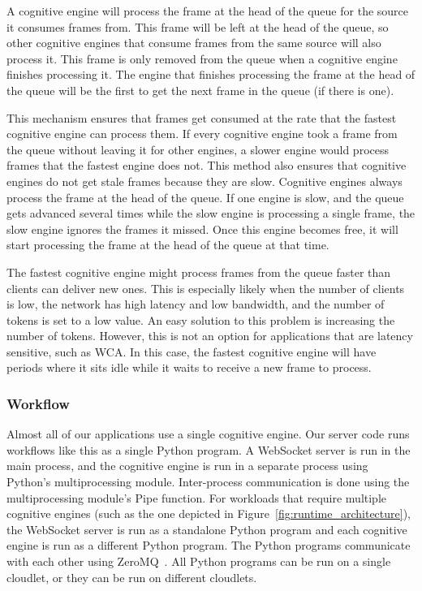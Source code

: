 A cognitive engine will process the
frame at the head of the queue for the source it consumes frames from. This
frame will be left at the head of the queue, so other cognitive engines that
consume frames from the same source will also process it. This frame is only
removed from the queue when a cognitive engine finishes processing it. The
engine that finishes processing the frame at the head of the queue will be the
first to get the next frame in the queue (if there is one).

This mechanism ensures that frames get consumed at the rate that the fastest
cognitive engine can process them.
If every cognitive engine took a frame from the queue without leaving it for
other engines, a slower engine would process frames that the fastest engine does
not.
This method also ensures that cognitive engines do not get stale
frames because they are slow. Cognitive engines always process the frame at the
head of the queue. If one engine is slow, and the queue gets advanced several
times while the slow engine is processing a single frame, the slow engine
ignores the frames it missed. Once this engine becomes free, it will start
processing the frame at the head of the queue at that time.

The fastest cognitive engine might process frames from the queue faster than
clients can deliver new ones.
This is especially likely when the number of clients is low, the network has
high latency and low bandwidth, and the number of tokens is set to a low value.
An easy solution to this problem is increasing the number of tokens.
However, this is not an option for applications that are latency sensitive, such
as WCA.
In this case, the fastest cognitive engine will have periods where it sits idle
while it waits to receive a new frame to process.

\subsubsection{Workflow}

Almost all of our applications use a single cognitive engine. Our server code
runs workflows like this as a single Python program. A WebSocket server is run
in the main process, and the cognitive engine is run in a separate process using
Python's multiprocessing module. Inter-process communication is done using the
multiprocessing module's Pipe function. For workloads that require multiple
cognitive engines (such as the one depicted in
Figure~\ref{fig:runtime_architecture}),
the WebSocket server is run as a standalone Python program and each cognitive
engine is run as a different Python program.
The Python programs communicate with each other using ZeroMQ~\cite{zmq}.
All Python programs can be run on a single cloudlet, or they can be run on
different cloudlets.

